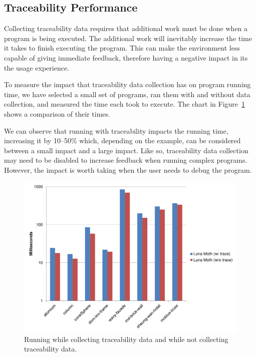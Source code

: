 \subsection{Traceability Performance}
Collecting traceability data requires that additional work must be done when a program is being executed.
The additional work will inevitably increase the time it takes to finish executing the program.
This can make the environment less capable of giving immediate feedback, therefore having a negative impact in its the usage experience.

To measure the impact that traceability data collection has on program running time, we have selected a small set of programs, ran them with and without data collection, and measured the time each took to execute.
The chart in Figure~\ref{fig:traceability:timing} shows a comparison of their times.

We can observe that running with traceability impacts the running time, increasing it by 10--50\% which, depending on the example, can be considered between a small impact and a large impact.
Like so, traceability data collection may need to be disabled to increase feedback when running complex programs.
However, the impact is worth taking when the user needs to debug the program.

\begin{figure}
  \centering
  \includegraphics[width=1.0\textwidth]{./images/traceability_timing}
  \caption{Running while collecting traceability data and while not collecting traceability data.}
  \label{fig:traceability:timing}
\end{figure}





